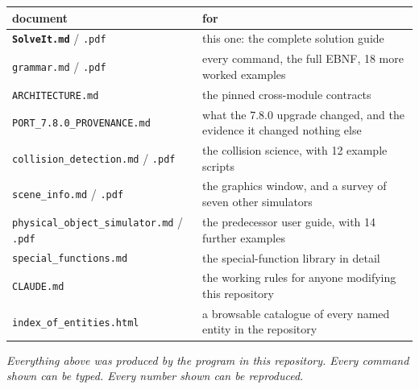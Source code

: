 \documentclass[11pt]{article}
\newcommand{\code}[1]{\texttt{#1}}
\begin{document}
\begin{center}
\begin{tabular}{p{5.2cm}p{9.4cm}}
\textbf{document} & \textbf{for}\\\hline
\textbf{\code{SolveIt.md}} / \code{.pdf} & this one: the complete solution guide\\
\code{grammar.md} / \code{.pdf} & every command, the full EBNF, 18 more worked examples\\
\code{ARCHITECTURE.md} & the pinned cross-module contracts\\
\code{PORT\_7.8.0\_PROVENANCE.md} & what the 7.8.0 upgrade changed, and the evidence it changed nothing else\\
\code{collision\_detection.md} / \code{.pdf} & the collision science, with 12 example scripts\\
\code{scene\_info.md} / \code{.pdf} & the graphics window, and a survey of seven other simulators\\
\code{physical\_object\_simulator.md} / \code{.pdf} & the predecessor user guide, with 14 further examples\\
\code{special\_functions.md} & the special-function library in detail\\
\code{CLAUDE.md} & the working rules for anyone modifying this repository\\
\code{index\_of\_entities.html} & a browsable catalogue of every named entity in the repository\\
\end{tabular}
\end{center}

\vspace{1em}
\begin{center}
\emph{Everything above was produced by the program in this repository.
Every command shown can be typed. Every number shown can be
reproduced.}
\end{center}
\end{document}
